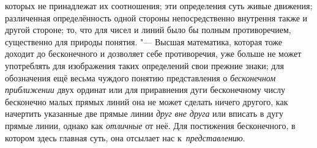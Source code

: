 которых не принадлежат их соотношения; эти определения суть живые движения;
различенная определённость одной стороны непосредственно внутрення также и
другой стороне; то, что для чисел и линий было бы полным
противоречием, существенно для природы понятия. "--- Высшая
математика, которая тоже доходит до бесконечного и дозволяет себе
противоречия, уже больше не может употреблять для изображения таких
определений свои прежние знаки; для обозначения ещё весьма чуждого понятию
представления о {\em бесконечном приближении} двух ординат или для приравнения
дуги бесконечному числу бесконечно малых прямых линий она не может сделать
ничего другого, как начертить указанные две прямые линии {\em друг вне друга}
или вписать в дугу прямые линии, однако как {\em отличные} от неё. Для
постижения бесконечного, в котором здесь главная суть, она отсылает нас
к~{\em представлению}.

